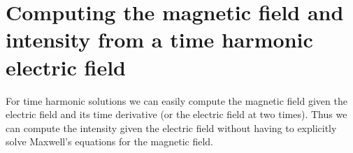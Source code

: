 \newcommand{\Ehv}{\widehat{\Ev}}
\newcommand{\Hhv}{\widehat{\Hv}}
\newcommand{\Ehrv}{\Ehv_r}
\newcommand{\Ehiv}{\Ehv_i}
\newcommand{\Hhrv}{\Hhv_r}
\newcommand{\Hhiv}{\Hhv_i}
\newcommand{\Etv}{\widetilde{\Ev}}
\newcommand{\Htv}{\widetilde{\Hv}}
\section{Computing the magnetic field and intensity from a time harmonic electric field}

For time harmonic solutions we can easily compute the magnetic field given
the electric field and its time derivative (or the electric field at two times).
Thus we can compute the intensity given the electric field without having
to explicitly solve Maxwell's equations for the magnetic field. 


